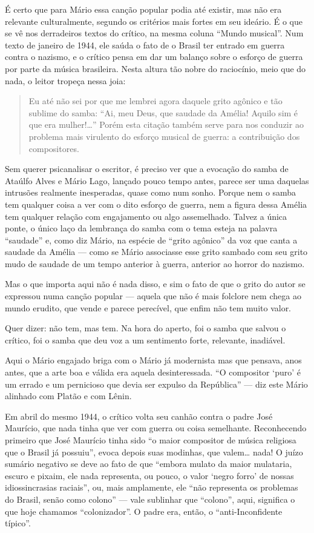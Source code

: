 É certo que para Mário essa canção popular podia até existir, mas não
era relevante culturalmente, segundo os critérios mais fortes em seu
ideário. É o que se vê nos derradeiros textos do crítico, na mesma
coluna ``Mundo musical''. Num texto de janeiro de 1944, ele saúda o fato
de o Brasil ter entrado em guerra contra o nazismo, e o crítico pensa em
dar um balanço sobre o esforço de guerra por parte da música brasileira.
Nesta altura tão nobre do raciocínio, meio que do nada, o leitor tropeça
nessa joia:

\begin{quote}
Eu até não sei por que me lembrei agora daquele grito agônico e tão
sublime do samba: ``Ai, meu Deus, que saudade da Amélia! Aquilo sim é
que era mulher!\ldots{}'' Porém esta citação também serve para nos conduzir
ao problema mais virulento do esforço musical de guerra: a contribuição
dos compositores.
\end{quote}

Sem querer psicanalisar o escritor, é preciso ver que a evocação do
samba de Ataúlfo Alves e Mário Lago, lançado pouco tempo antes, parece
ser uma daquelas intrusões realmente inesperadas, quase como num sonho.
Porque nem o samba tem qualquer coisa a ver com o dito esforço de
guerra, nem a figura dessa Amélia tem qualquer relação com engajamento
ou algo assemelhado. Talvez a única ponte, o único laço da lembrança do
samba com o tema esteja na palavra ``saudade'' e, como diz Mário, na
espécie de ``grito agônico'' da voz que canta a saudade da Amélia ---
como se Mário associasse esse grito sambado com seu grito mudo de
saudade de um tempo anterior à guerra, anterior ao horror do nazismo.

Mas o que importa aqui não é nada disso, e sim o fato de que o grito do
autor se expressou numa canção popular --- aquela que não é mais folclore
nem chega ao mundo erudito, que vende e parece perecível, que enfim não
tem muito valor.

Quer dizer: não tem, mas tem. Na hora do aperto, foi o samba que salvou
o crítico, foi o samba que deu voz a um sentimento forte, relevante,
inadiável.

Aqui o Mário engajado briga com o Mário já modernista mas que pensava,
anos antes, que a arte boa e válida era aquela desinteressada. ``O
compositor `puro' é um errado e um pernicioso que devia ser expulso da
República'' --- diz este Mário alinhado com Platão e com Lênin.

Em abril do mesmo 1944, o crítico volta seu canhão contra o padre José
Maurício, que nada tinha que ver com guerra ou coisa semelhante.
Reconhecendo primeiro que José Maurício tinha sido ``o maior compositor
de música religiosa que o Brasil já possuiu'', evoca depois suas
modinhas, que valem\ldots{} nada! O juízo sumário negativo se deve ao fato de
que ``embora mulato da maior mulataria, escuro e pixaim, ele nada
representa, ou pouco, o valor `negro forro' de nossas idiossincrasias
raciais'', ou, mais amplamente, ele ``não representa os problemas do
Brasil, senão como colono'' --- vale sublinhar que ``colono'', aqui,
significa o que hoje chamamos ``colonizador''. O padre era, então, o
``anti-Inconfidente típico''.

